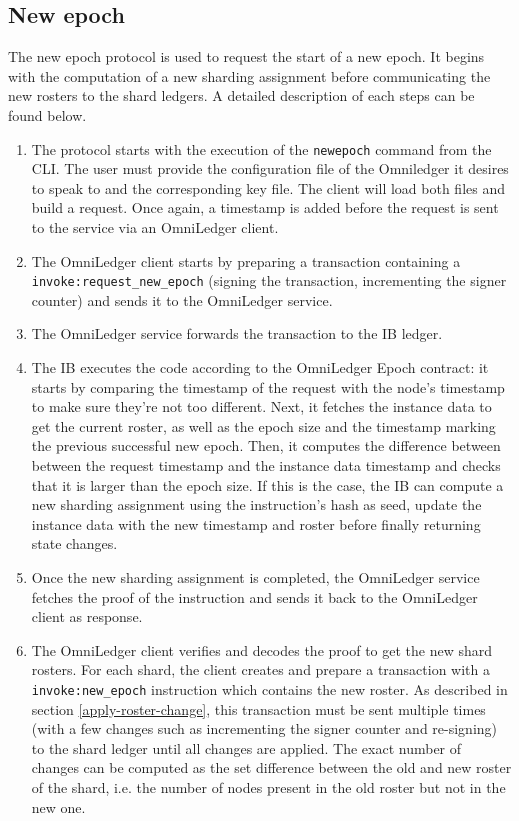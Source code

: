 \subsection{New epoch} \label{new-epoch}
The new epoch protocol is used to request the start of a new epoch. It begins with the computation of a new sharding assignment before communicating the new rosters to the shard ledgers. A detailed description of each steps can be found below. 
\begin{enumerate}
	\item The protocol starts with the execution of the \texttt{newepoch} command from the CLI. The user must provide the  configuration file of the Omniledger it desires to speak to and the corresponding key file. The client will load both files and build a request. Once again, a timestamp is added before the request is sent to the service via an OmniLedger client.
	
	\item The OmniLedger client starts by preparing a transaction containing a \texttt{invoke:request\_new\_epoch} (signing the transaction, incrementing the signer counter) and sends it to the OmniLedger service.
	
	\item The OmniLedger service forwards the transaction to the IB ledger.
	
	\item The IB executes the code according to the OmniLedger Epoch contract: it starts by comparing the timestamp of the request with the node's timestamp to make sure they're not too different. Next, it fetches the instance data to get the current roster, as well as the epoch size and the timestamp marking the previous successful new epoch. Then, it computes the difference between between the request timestamp and the instance data timestamp and checks that it is larger than the epoch size. If this is the case, the IB can compute a new sharding assignment using the instruction's hash as seed, update the instance data with the new timestamp and roster before finally returning state changes.
	
	\item Once the new sharding assignment is completed, the OmniLedger service fetches the proof of the instruction and sends it back to the OmniLedger client as response.
	
	\item The OmniLedger client verifies and decodes the proof to get the new shard rosters. For each shard, the client creates and prepare a transaction with a \texttt{invoke:new\_epoch} instruction which contains the new roster. As described in section \ref{apply-roster-change}, this transaction must be sent multiple times (with a few changes such as incrementing the signer counter and re-signing) to the shard ledger until all changes are applied. The exact number of changes can be computed as the set difference between the old and new roster of the shard, i.e. the number of nodes present in the old roster but not in the new one.
	

\end{enumerate}
